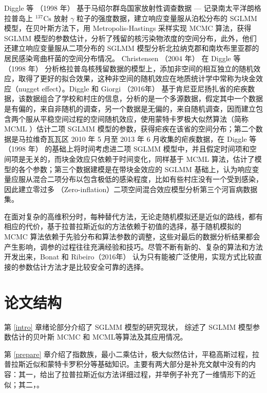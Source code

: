 \documentclass[12pt,a4paper,UTF8,twoside]{book}
\theoremstyle{definition}
\theoremstyle{definition}
\theoremstyle{definition}
\theoremstyle{remark}
\begin{document}
Diggle 等 （1998 年） \citep{Diggle1998}基于马绍尔群岛国家放射性调查数据
--- 记录南太平洋朗格拉普岛上 \({}^{137}\mathrm{Cs}\) 放射 \(\gamma\)
粒子的强度数据，建立响应变量服从泊松分布的 SGLMM
模型，在贝叶斯方法下，用 Metropolis-Hastings 采样实现 MCMC 算法，获得
SGLMM
模型的参数估计，分析了残留的核污染物浓度的空间分布，此外，他们还建立响应变量服从二项分布的
SGLMM 模型分析北拉纳克郡和南坎布里亚郡的居民感染弯曲杆菌的空间分布情况。
Christensen （2004 年） \citep{Christensen2004} 在 Diggle 等 （1998 年）
\citep{Diggle1998}
分析格拉普岛核残留数据的模型上，添加非空间的相互独立的随机效应，取得了更好的拟合效果，这种非空间的随机效应在地质统计学中常称为块金效应（nugget
effect）。Diggle 和 Giorgi （2016年） \citep{Diggle2016}
基于肯尼亚尼扬扎省的疟疾数据，该数据组合了学校和村庄的信息，分析的是一个多源数据，假定其中一个数据是有偏的，来自非随机的调查，另一个数据是无偏的，来自随机调查，因而建立包含两个服从平稳空间过程的空间随机效应，使用蒙特卡罗极大似然算法（简称
MCML ）估计二项 SGLMM
模型的参数，获得疟疾在该省的空间分布；第二个数据是马拉维奇瓦瓦区 2010 年
5 月至 2013 年 6 月收集的疟疾数据，在 Diggle 等 （1998 年）
\citep{Diggle1998}的基础上将时间考虑进二项 SGLMM
模型中，并且假定时间项和空间项是无关的，而块金效应只依赖于时间变化，同样基于
MCML 算法，估计了模型的各个参数；第三个数据建模是在带块金效应的 SGLMM
基础上，认为响应变量应服从混合二项分布以包含极低的感染程度，比如有些村庄没有一个受到感染，因此建立零过多
（Zero-inflation）二项空间混合效应模型分析第三个河盲病数据集。

在面对复杂的高维积分时，每种替代方法，无论走随机模拟还是近似的路线，都有相应的代价，基于拉普拉斯近似的方法依赖于初值的选择，基于随机模拟的
MCMC
算法依赖于先验分布和算法参数的调整，这些对最后的数据分析结果都会产生影响，调参的过程往往充满经验和技巧。尽管不断有新的、复杂的算法和方法开发出来，Bonat
和 Ribeiro（2016年） \citep{Bonat2016Practical}
认为只有能被广泛使用，实现方式比较直接的参数估计方法才是比较安全可靠的选择。

\hypertarget{stracture}{%
\section{论文结构}\label{stracture}}

第 \ref{intro} 章绪论部分介绍了 SGLMM 模型的研究现状， 综述了 SGLMM
模型参数估计的贝叶斯 MCMC 和 MCML等算法及其应用情况。

第 \ref{prepare}
章介绍了指数族，最小二乘估计，极大似然估计，平稳高斯过程，拉普拉斯近似和蒙特卡罗积分等基础知识。主要有两大部分是补充文献中没有的内容：其一，给出了拉普拉斯近似方法详细过程，并举例子补充了一维情形下的近似；其二，。
\end{document}
